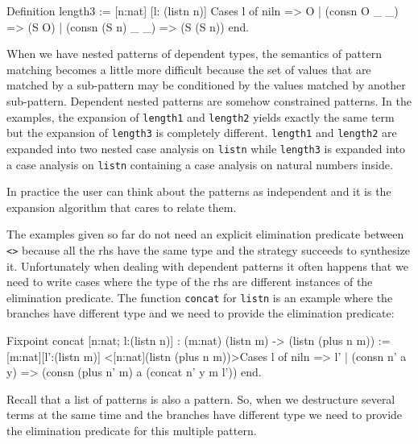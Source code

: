 \begin{coq_example}
Definition length3 := [n:nat] [l: (listn n)]
                         Cases l of 
                            niln              => O
                         |  (consn O _ _)     => (S O)
                         |  (consn (S n) _ _) => (S (S n))
                         end.
\end{coq_example}

When we have nested patterns of dependent types, the semantics of
pattern matching becomes a little more difficult because
the set of values that are matched by a sub-pattern may be conditioned by the
values matched by another sub-pattern. Dependent nested patterns are
somehow constrained patterns. 
In the examples, the expansion of
\texttt{length1} and \texttt{length2} yields exactly the same term
 but the
expansion of \texttt{length3} is completely different. \texttt{length1} and
\texttt{length2} are expanded into two nested case analysis on
\texttt{listn} while \texttt{length3} is expanded into a case analysis on
\texttt{listn} containing a case analysis on natural numbers inside.


In practice the user can think about the patterns as independent and
it is the expansion algorithm that cares to relate them. \\
\fi
%
%
%

The examples  given so far do not need an explicit elimination predicate
between \texttt{<>} because all the rhs have the same type and the
strategy succeeds to synthesize it.
Unfortunately when dealing with dependent patterns it often happens
that we need to write cases where the type of the rhs are 
different  instances of the elimination  predicate.
The function  \texttt{concat} for \texttt{listn}
is an example where the branches have different type
and we need to provide the elimination predicate:

\begin{coq_example}
Fixpoint concat [n:nat; l:(listn n)]
 :  (m:nat) (listn m) -> (listn (plus n m))
 := [m:nat][l':(listn m)] 
      <[n:nat](listn (plus n m))>Cases l  of 
         niln          => l'
      | (consn n' a y) => (consn (plus n' m) a (concat n' y m l'))
      end.
\end{coq_example}

Recall that a list of patterns is also a pattern. So, when
we destructure several terms at the same time and the branches have
different type  we need to provide
the elimination predicate for this multiple pattern.

